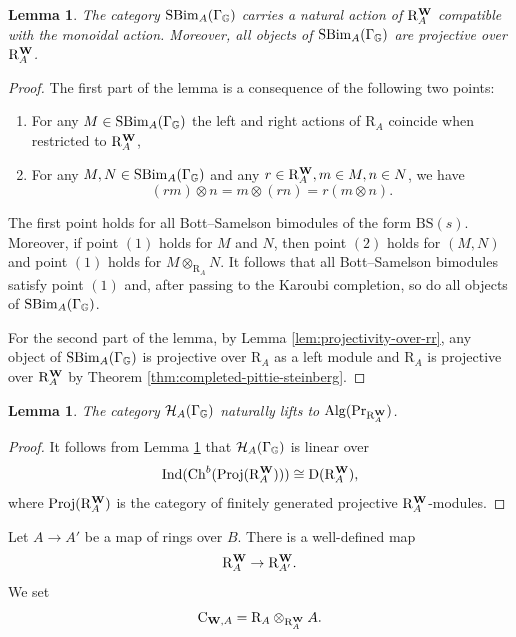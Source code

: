 \documentclass[a4paper, 10pt, oneside, reqno]{amsart}
\theoremstyle{plain}
\newtheorem{lem}[thm]{Lemma}
\theoremstyle{definition}
\theoremstyle{remark}
\newcommand{\Gbb}{\mathbb{G}}
\newcommand{\RR}{\mathrm{R}}
\newcommand{\BS}{\mathrm{BS}}
\newcommand{\Prr}{\mathrm{Pr}}
\newcommand{\Cc}{\mathrm{C}}
\newcommand{\Proj}{\mathrm{Proj}}
\begin{document}
\begin{lem}\label{lem:coincidence-of-actions}
The category $\SBim_A(\Gamma_{\Gbb})$ carries a natural action of $\RR_{A}^{\Wbf}$ compatible with the monoidal action. Moreover, all objects of $\SBim_A(\Gamma_{\Gbb})$ are projective over $\RR_A^{\Wbf}$.
\end{lem}

\begin{proof}
The first part of the lemma is a consequence of the following two points: 
\begin{enumerate}
\item For any $M \in \SBim_A(\Gamma_{\Gbb})$ the left and right actions of $\RR_A$ coincide when restricted to $\RR_A^{\Wbf}$, 
\item For any $M,N \in \SBim_A(\Gamma_{\Gbb})$ and any $r \in \RR_A^{\Wbf}, m \in M, n \in N$, we have 
$$(rm) \otimes n = m \otimes (rn) = r(m \otimes n).$$
\end{enumerate}
The first point holds for all Bott--Samelson bimodules of the form $\BS(s)$. Moreover, if point $(1)$ holds for $M$ and $N$, then point $(2)$ holds for $(M,N)$ and point $(1)$ holds for $M \otimes_{\RR_A} N$. It follows that all Bott--Samelson bimodules satisfy point $(1)$ and, after passing to the Karoubi completion, so do all objects of $\SBim_{A}(\Gamma_{\Gbb})$. 

For the second part of the lemma, by Lemma \ref{lem:projectivity-over-rr}, any object of $\SBim_A(\Gamma_{\Gbb})$ is projective over $\RR_A$ as a left module and $\RR_A$ is projective over $\RR_A^{\Wbf}$ by Theorem \ref{thm:completed-pittie-steinberg}. 
\end{proof}

\begin{lem}\label{lem:lifting-to-rr-invariants}
The category $\Hcal_A(\Gamma_{\Gbb})$ naturally lifts to $\Alg(\Prr_{\RR_A^{\Wbf}})$. 
\end{lem}

\begin{proof}
It follows from Lemma \ref{lem:coincidence-of-actions} that $\Hcal_A(\Gamma_{\Gbb})$ is linear over
\[
\Ind(\Ch^b(\Proj(\RR_A^{\Wbf}))) \cong \DD(\RR_A^{\Wbf}),
\]
where $\Proj(\RR_A^{\Wbf})$ is the category of finitely generated projective $\RR_A^{\Wbf}$-modules.
\end{proof}

Let $A  \to A'$ be a map of rings over $B$. There is a well-defined map 
$$\RR_A^{\Wbf} \to \RR_{A'}^{\Wbf}.$$
We set 
$$\Cc_{\Wbf,A} = \RR_A \otimes_{\RR_A^{\Wbf}} A.$$
\end{document}
